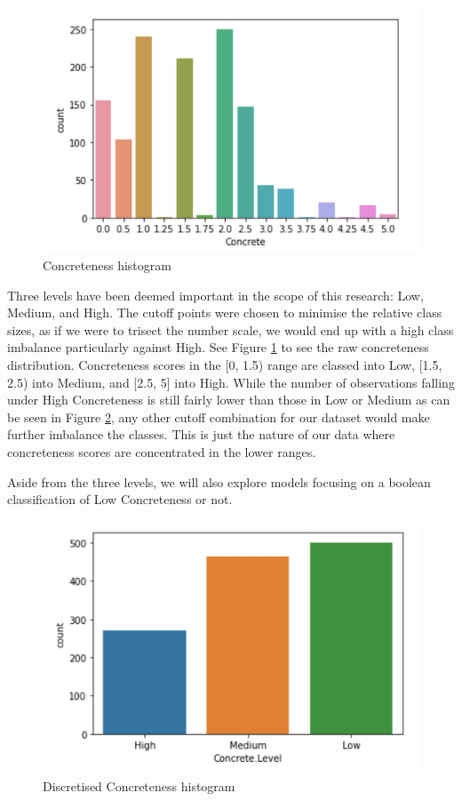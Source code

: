 \documentclass[12pt, a4paper]{article}
\begin{document}
\begin{figure}[ht]
\centerline{\includegraphics[scale=0.8]{concreteness_distribution.png}}
\caption{Concreteness histogram}
\label{concreteness_distribution}
\end{figure}
 
Three levels have been deemed important in the scope of this research: Low, Medium, and High. The cutoff points were chosen to minimise the relative class sizes, as if we were to trisect the number scale, we would end up with a high class imbalance particularly against High. See Figure \ref{concreteness_distribution} to see the raw concreteness distribution. Concreteness scores in the [0, 1.5) range are classed into Low, [1.5, 2.5) into Medium, and [2.5, 5] into High. While the number of observations falling under High Concreteness is still fairly lower than those in Low or Medium as can be seen in Figure \ref{concreteness_discrete_distribution}, any other cutoff combination for our dataset would make further imbalance the classes. This is just the nature of our data where concreteness scores are concentrated in the lower ranges.

Aside from the three levels, we will also explore models focusing on a boolean classification of Low Concreteness or not. 

\begin{figure}
\centerline{\includegraphics[scale=0.8]{concreteness_discrete_distribution.png}}
\caption{Discretised Concreteness histogram}
\label{concreteness_discrete_distribution}
\end{figure}
\end{document}
